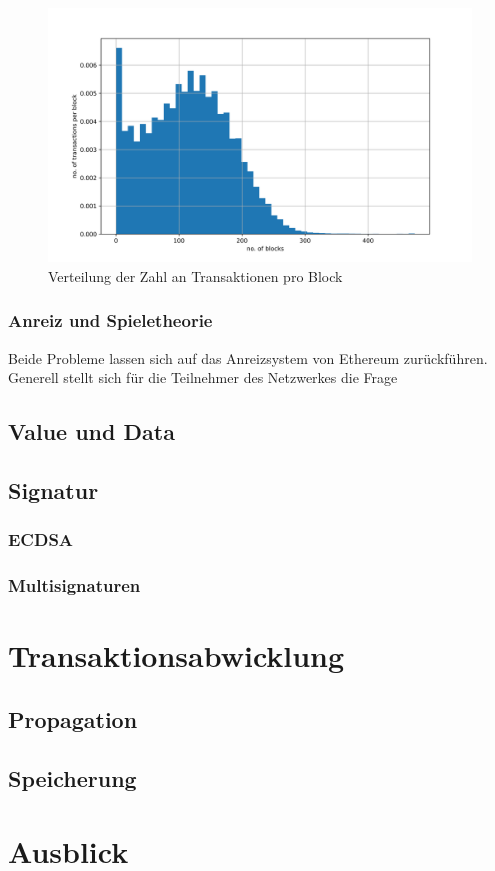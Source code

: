\documentclass[runningheads]{llncs}
\begin{document}
\begin{figure}[h]
  \includegraphics[width=\textwidth, keepaspectratio]{blocks_transactions_per_block.png}
  \caption{Verteilung der Zahl an Transaktionen pro Block \cite{neemann_appendix_nodate}}
  \label{blocks_transactions_per_block}
\end{figure}

\subsubsection{Anreiz und Spieletheorie}
Beide Probleme lassen sich auf das Anreizsystem von Ethereum zurückführen. Generell stellt sich für die Teilnehmer des Netzwerkes die Frage  

\subsection{Value und Data}

\subsection{Signatur}

\subsubsection{ECDSA}
\label{ecdsa}

\subsubsection{Multisignaturen}

\section{Transaktionsabwicklung}

\subsection{Propagation}

\subsection{Speicherung}

\section{Ausblick}



\end{document}
